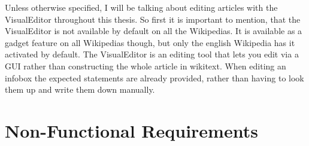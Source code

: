 Unless otherwise specified, I will be talking about editing articles with the VisualEditor throughout this thesis. So first it is important to mention, that the VisualEditor is not available by default on all the Wikipedias. It is available as a gadget feature on all Wikipedias though, but only the english Wikipedia has it activated by default. The VisualEditor is an editing tool that lets you edit via a GUI rather than constructing the whole article in wikitext. When editing an infobox the expected statements are already provided, rather than having to look them up and write them down manually. 

\section{Non-Functional Requirements}

